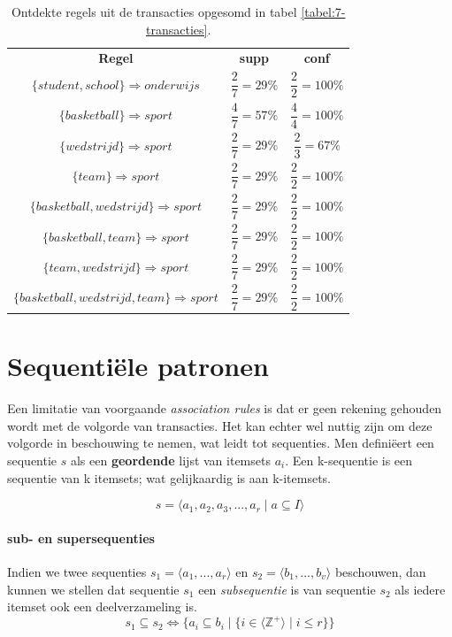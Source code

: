 \begin{table}
\centering
\caption{Ontdekte regels uit de transacties opgesomd in tabel \ref{tabel:7-transacties}.}
\label{tabel:regels-7-transacties}
\begin{tabular}{c|c|c}
\textbf{Regel} & \textbf{supp} & \textbf{conf} \\
$\{student, school\} \Rightarrow onderwijs$ & $\dfrac{2}{7}=29\%$ & $\dfrac{2}{2}=100\%$\\[10pt]
$\{basketball\} \Rightarrow sport$ & $\dfrac{4}{7}=57\%$ & $\dfrac{4}{4}=100\%$\\[10pt]
$\{wedstrijd\} \Rightarrow sport$ & $\dfrac{2}{7}=29\%$ & $\dfrac{2}{3}=67\%$ \\[10pt]
$\{team\} \Rightarrow sport$ & $\dfrac{2}{7}=29\%$ & $\dfrac{2}{2}=100\%$ \\[10pt]
$\{basketball, wedstrijd\} \Rightarrow sport$ & $\dfrac{2}{7}=29\%$ & $\dfrac{2}{2}=100\%$\\[10pt]
$\{basketball, team\} \Rightarrow sport$ & $\dfrac{2}{7}=29\%$ & $\dfrac{2}{2}=100\%$\\[10pt]
$\{team, wedstrijd\} \Rightarrow sport$ & $\dfrac{2}{7}=29\%$ & $\dfrac{2}{2}=100\%$\\[10pt]
$\{basketball, wedstrijd, team\} \Rightarrow sport$ & $\dfrac{2}{7}=29\%$ & $\dfrac{2}{2}=100\%$\\

\end{tabular}
\end{table}

%
\section{Sequenti\"ele patronen}
Een limitatie van voorgaande \emph{association rules} is dat er geen rekening gehouden wordt met de volgorde van transacties. Het kan echter wel nuttig zijn om deze volgorde in beschouwing te nemen, wat leidt tot sequenties. Men defini\"eert een sequentie $s$ als een \textbf{geordende} lijst van itemsets $a_i$. Een k-sequentie is een sequentie van k itemsets; wat gelijkaardig is aan k-itemsets.

\begin{equation}
s = \langle a_1, a_2, a_3, ..., a_r \mid a \subseteq I  \rangle
\end{equation}

\paragraph{sub- en supersequenties}
Indien we twee sequenties $s_1 = \langle a_1, ..., a_r \rangle
$ en $s_2 = \langle b_1, ..., b_v \rangle$ beschouwen, dan kunnen we stellen dat sequentie $s_1$ een \emph{subsequentie} is van sequentie $s_2$ als iedere itemset ook een deelverzameling is. 
\begin{equation}
s_1 \subseteq s_2 \iff \{a_i \subseteq b_i \mid \{i \in \langle\mathds{Z}^{+}\rangle \mid i \leq r \} \} 
\end{equation}

